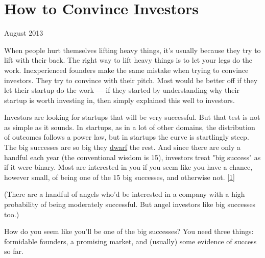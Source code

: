 \chapter{How to Convince Investors}


            
              
                


                  
                    August 2013

When people hurt themselves lifting
                    heavy things, it's usually because they try to lift with
                    their back. The right way to lift heavy things is to let
                    your legs do the work. Inexperienced founders make the same
                    mistake when trying to convince investors. They try to
                    convince with their pitch. Most would be better off if they
                    let their startup do the work --- if they started by
                    understanding why their startup is worth investing in, then
                    simply explained this well to investors.

Investors
                    are looking for startups that will be very successful. But
                    that test is not as simple as it sounds. In startups, as in
                    a lot of other domains, the distribution of outcomes follows
                    a power law, but in startups the curve is startlingly steep.
                    The big successes are so big they
                    \href{http://www.paulgraham.com/swan.html}{dwarf} the rest. And since there are
                    only a handful each year (the conventional wisdom is 15),
                    investors treat "big success" as if it were binary. Most are
                    interested in you if you seem like you have a chance,
                    however small, of being one of the 15 big successes, and
                    otherwise not.
                    [\href{\#f1n}{1}]

(There are a handful of angels who'd be
                    interested in a company with a high probability of being
                    moderately successful. But angel investors like big
                    successes too.)

How do you seem like you'll be
                    one of the big successes? You need three things: formidable
                    founders, a promising market, and (usually) some evidence of
                    success so far.

